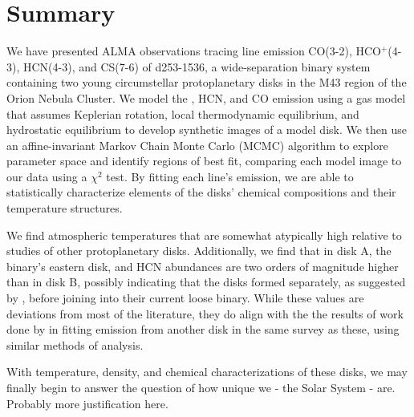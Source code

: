 \chapter{Summary}
\label{chap:Summary}


We have presented ALMA observations tracing line emission CO(3-2), HCO$^+$(4-3), HCN(4-3), and CS(7-6) of d253-1536, a wide-separation binary system containing two young circumstellar protoplanetary disks in the M43 region of the Orion Nebula Cluster. We model the \hco, HCN, and CO emission using a gas model that assumes Keplerian rotation, local thermodynamic equilibrium, and hydrostatic equilibrium to develop synthetic images of a model disk. We then use an affine-invariant Markov Chain Monte Carlo (MCMC) algorithm to explore parameter space and identify regions of best fit, comparing each model image to our data using a $\chi^2$ test. By fitting each line's emission, we are able to statistically characterize elements of the disks' chemical compositions and their temperature structures.

We find atmospheric temperatures that are somewhat atypically high relative to studies of other protoplanetary disks. Additionally, we find that in disk A, the binary's eastern disk, \hco and HCN abundances are two orders of magnitude higher than in disk B, possibly indicating that the disks formed separately, as suggested by \cite{Williams2014}, before joining into their current loose binary. While these values are deviations from most of the literature, they do align with the the results of work done by \citet{Factor2017} in fitting \hco emission from another disk in the same survey as these, using similar methods of analysis.


With temperature, density, and chemical characterizations of these disks, we may finally begin to answer the question of how unique we - the Solar System - are. Probably more justification here.


